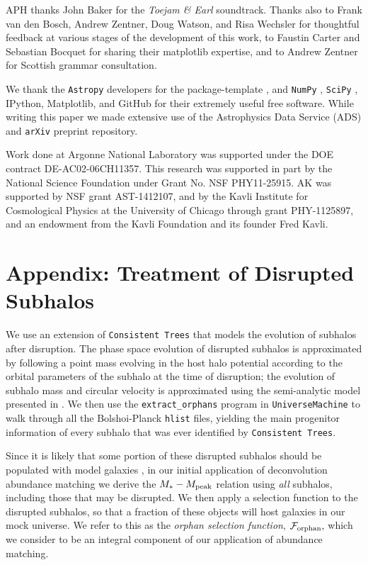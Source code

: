 \documentclass[usenatbib,usegraphicx,letterpaper]{mn2e}
\newcommand{\mstar}{M_{\ast}}
\newcommand{\mpeak}{M_{\rm peak}}
\begin{document}
APH thanks John Baker for the {\em Toejam \& Earl} soundtrack. Thanks also to Frank van den Bosch, Andrew Zentner, Doug Watson, and Risa Wechsler for thoughtful feedback at various stages of the development of this work, to Faustin Carter and Sebastian Bocquet for sharing their matplotlib expertise, and to Andrew Zentner for Scottish grammar consultation.

We thank the {\tt Astropy} developers for the package-template \citep{astropy}, and {\tt NumPy} \citep{numpy_ndarray}, {\tt SciPy} \citep{scipy}, IPython, Matplotlib, and GitHub for their extremely useful free software. While writing this paper we made extensive use of the Astrophysics Data Service (ADS) and {\tt arXiv} preprint repository.

Work done at Argonne National Laboratory was supported under the DOE contract DE-AC02-06CH11357. This research was supported in part by the National Science Foundation under Grant No. NSF PHY11-25915.  AK was  supported by NSF grant  AST-1412107, and by the Kavli Institute for Cosmological Physics at the University of Chicago through grant PHY-1125897, and an endowment from the Kavli Foundation and its founder Fred Kavli.



\section*{Appendix: Treatment of Disrupted Subhalos}

We use an extension of {\tt Consistent Trees} that models the evolution of subhalos after disruption. The phase space evolution of disrupted subhalos is approximated by following a point mass evolving in the host halo potential according to the orbital parameters of the subhalo at the time of disruption; the evolution of subhalo mass and circular velocity is approximated using the semi-analytic model presented in \citet{jiang_vdB14}. We then use the {\tt extract\_orphans} program in {\tt UniverseMachine} to walk through all the Bolshoi-Planck {\tt hlist} files, yielding the main progenitor information of every subhalo that was ever identified by {\tt Consistent Trees}.

Since it is likely that some portion of these disrupted subhalos should be populated with model galaxies \citep{guo_white13, campbell_etal17}, in our initial application of deconvolution abundance matching we derive the $\mstar-\mpeak$ relation using {\em all} subhalos, including those that may be disrupted. We then apply a selection function to the disrupted subhalos, so that a fraction of these objects will host galaxies in our mock universe. We refer to this as the {\em orphan selection function}, $\mathcal{F}_{\rm orphan},$ which we consider to be an integral component of our application of abundance matching.
\end{document}
